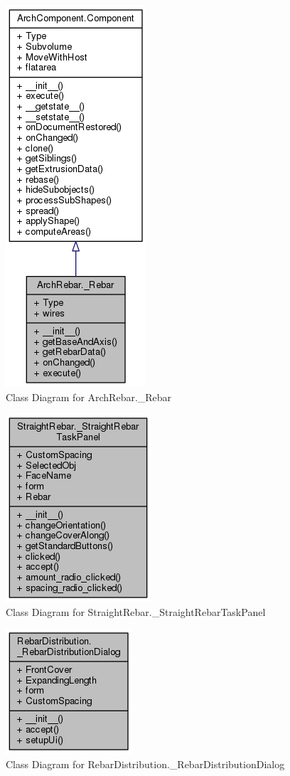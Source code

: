 \begin{figure}
    \centering
    \includegraphics[scale=.85]{images/archRebar.png}
    \caption{Class Diagram for ArchRebar.\_Rebar}
    \label{fig:collaborative1}
\end{figure}

\begin{figure}
    \centering
    \includegraphics[scale=.85]{images/straightclass.png}
    \caption{Class Diagram for StraightRebar.\_StraightRebarTaskPanel}
    \label{fig:collaborative}
\end{figure}

\begin{figure}
\centering
\includegraphics[scale=.85]{images/rebarDistributionclass.png}
\caption{Class Diagram for RebarDistribution.\_RebarDistributionDialog}
\label{fig:classAnnotation__coll__graph}
\end{figure}

